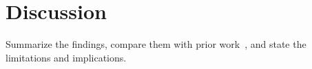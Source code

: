 \section{Discussion}
Summarize the findings, compare them with prior work~\cite{example2024article},
and state the limitations and implications.
